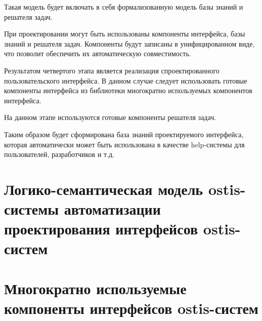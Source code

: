 Такая модель будет включать в себя формализованную модель базы знаний и решателя задач.

При проектировании могут быть использованы компоненты интерфейса, базы знаний и решателя задач. 
Компоненты будут записаны в унифицированном виде, что позволит обеспечить их автоматическую совместимость.


Результатом четвертого этапа является реализация спроектированного пользовательского интерфейса. В данном случае следует использовать готовые компоненты интерфейса из библиотеки многократно используемых компонентов интерфейса.

На данном этапе используются готовые компоненты решателя задач.


Таким образом будет сформирована база знаний проектируемого интерфейса, которая автоматически может быть использована в качестве help-системы для пользователей, разработчиков и т.д.



\section{Логико-семантическая модель ostis-системы автоматизации проектирования интерфейсов ostis-систем}
\section{Многократно используемые компоненты интерфейсов ostis-систем}

%